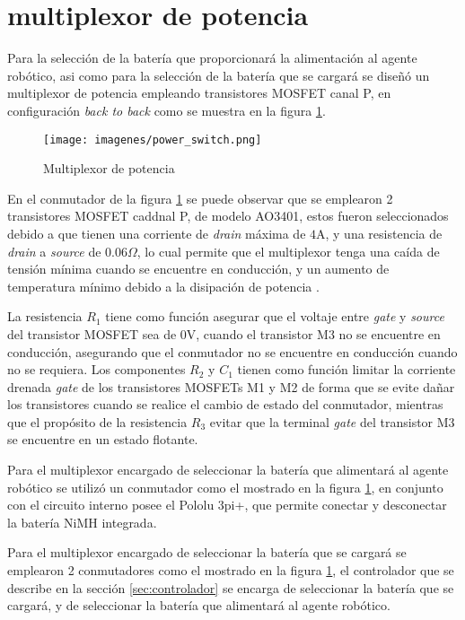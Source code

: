 \section{multiplexor de potencia}

    Para la selección de la batería que proporcionará la alimentación al agente
    robótico, asi como para la selección de la batería que se cargará se diseñó
    un multiplexor de potencia empleando transistores MOSFET canal P, en 
    configuración \textit{back to back} como se muestra en la figura \ref{fig:power_switch}.

    \begin{figure}[H]
        \centering
        \texttt{[image: imagenes/power\_switch.png]}
        \caption{Multiplexor de potencia}
        \label{fig:power_switch}
    \end{figure}

    En el conmutador de la figura \ref{fig:power_switch} se puede observar que se
    emplearon 2 transistores MOSFET caddnal P, de modelo AO3401, estos fueron
    seleccionados debido a que tienen una corriente de \textit{drain} máxima de
    $4\text{A}$, y una resistencia de \textit{drain} a \textit{source} de 
    $0.06\Omega$, lo cual permite que el multiplexor tenga una caída de tensión
    mínima cuando se encuentre en conducción, y un aumento de temperatura mínimo
    debido a la disipación de potencia \cite{a_AO3401}.

    La resistencia $R_1$ tiene como función asegurar que el voltaje 
    entre \textit{gate} y \textit{source} del transistor MOSFET sea de $0\text{V}$,
    cuando el transistor M3 no se encuentre en conducción, asegurando que 
    el conmutador no se encuentre en conducción cuando no se requiera. Los componentes 
    $R_2$ y $C_1$ tienen como función limitar la corriente drenada \textit{gate} de
    los transistores MOSFETs M1 y M2 de forma que se evite dañar los transistores
    cuando se realice el cambio de estado del conmutador, mientras que el propósito
    de la resistencia $R_3$ evitar que la terminal \textit{gate} del transistor
    M3 se encuentre en un estado flotante.

    Para el multiplexor encargado de seleccionar la batería que alimentará al
    agente robótico se utilizó un conmutador como el mostrado en la figura
    \ref{fig:power_switch}, en conjunto con el circuito interno posee el 
    Pololu 3pi+, que permite conectar y desconectar la batería NiMH integrada.

    Para el multiplexor encargado de seleccionar la batería que se cargará se
    emplearon 2 conmutadores como el mostrado en la figura \ref{fig:power_switch},
    el controlador que se describe en la sección \ref{sec:controlador} se encarga
    de seleccionar la batería que se cargará, y de seleccionar la batería que
    alimentará al agente robótico.

